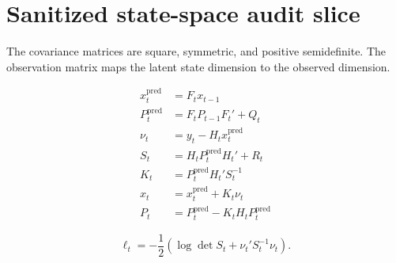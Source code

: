\section{Sanitized state-space audit slice}

\newcommand{\PredCov}{P^{\mathrm{pred}}_t}
\newcommand{\Innov}{\nu_t}
\newcommand{\InnovCov}{S_t}

\begin{assumption}\label{assump:dept-state-space-guards}
The covariance matrices are square, symmetric, and positive semidefinite. The observation matrix maps the latent state dimension to the observed dimension.
\end{assumption}

\begin{align}\label{eq:dept-state-space-recursion}
x^{\mathrm{pred}}_t &= F_t x_{t-1} \\
\PredCov &= F_t P_{t-1}F_t' + Q_t \\
\Innov &= y_t - H_t x^{\mathrm{pred}}_t \\
\InnovCov &= H_t \PredCov H_t' + R_t \\
K_t &= \PredCov H_t' \InnovCov^{-1} \\
x_t &= x^{\mathrm{pred}}_t + K_t \Innov \\
P_t &= \PredCov - K_t H_t \PredCov
\end{align}

\begin{equation}\label{eq:dept-state-space-likelihood}
\ell_t = -\frac{1}{2}\left(\log\det \InnovCov + \Innov' \InnovCov^{-1}\Innov\right).
\end{equation}
